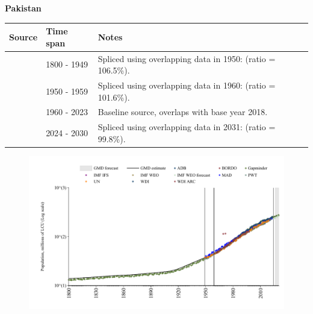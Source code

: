 \documentclass[12pt,a4paper,landscape]{article}
\begin{document}
\begin{adjustbox}{max totalsize={\paperwidth}{\paperheight},center}
\begin{minipage}[t][\textheight][t]{\textwidth}
\vspace*{0.5cm}
{}
\begin{center}
{\Large\bfseries Pakistan}
\end{center}
\vspace{0.5cm}
\begin{table}[H]
\centering
\small
\begin{tabular}{|l|l|l|}
\hline
\textbf{Source} & \textbf{Time span} & \textbf{Notes} \\
\hline
\rowcolor{white}\cite{Gapminder}& 1800 - 1949 &Spliced using overlapping data in 1950: (ratio = 106.5\%).\\
\rowcolor{lightgray}\cite{IMF_IFS}& 1950 - 1959 &Spliced using overlapping data in 1960: (ratio = 101.6\%).\\
\rowcolor{white}\cite{WDI}& 1960 - 2023 &Baseline source, overlaps with base year 2018.\\
\rowcolor{lightgray}\cite{Gapminder}& 2024 - 2030 &Spliced using overlapping data in 2031: (ratio = 99.8\%).\\
\hline
\end{tabular}
\end{table}
\begin{figure}[H]
\centering
\includegraphics[width=\textwidth,height=0.6\textheight,keepaspectratio]{graphs/PAK_pop.pdf}
\end{figure}
\end{minipage}
\end{adjustbox}
\end{document}
